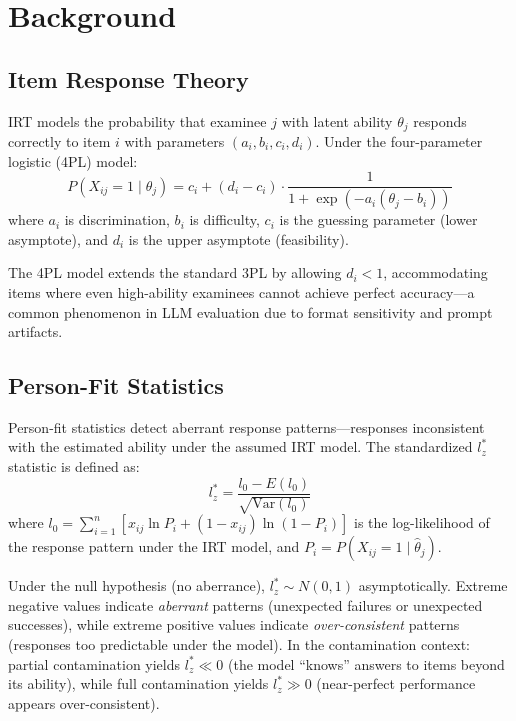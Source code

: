 \documentclass[11pt,a4paper]{article}
\begin{document}
\section{Background}

\subsection{Item Response Theory}

IRT models the probability that examinee $j$ with latent ability $\theta_j$ responds correctly to item $i$ with parameters $(a_i, b_i, c_i, d_i)$. Under the four-parameter logistic (4PL) model:
\begin{equation}
P(X_{ij}=1 \mid \theta_j) = c_i + (d_i - c_i) \cdot \frac{1}{1 + \exp(-a_i(\theta_j - b_i))}
\label{eq:4pl}
\end{equation}
where $a_i$ is discrimination, $b_i$ is difficulty, $c_i$ is the guessing parameter (lower asymptote), and $d_i$ is the upper asymptote (feasibility).

The 4PL model extends the standard 3PL by allowing $d_i < 1$, accommodating items where even high-ability examinees cannot achieve perfect accuracy---a common phenomenon in LLM evaluation due to format sensitivity and prompt artifacts.

\subsection{Person-Fit Statistics}

Person-fit statistics detect aberrant response patterns---responses inconsistent with the estimated ability under the assumed IRT model.
The standardized $l_{z}^{*}$ statistic \citep{drasgow1985appropriateness,snijders2001testing} is defined as:
\begin{equation}
l_{z}^{*} = \frac{l_0 - E(l_0)}{\sqrt{\text{Var}(l_0)}}
\label{eq:lzstar}
\end{equation}
where $l_0 = \sum_{i=1}^{n} [x_{ij} \ln P_i + (1-x_{ij}) \ln(1-P_i)]$ is the log-likelihood of the response pattern under the IRT model, and $P_i = P(X_{ij}=1 \mid \hat{\theta}_j)$.

Under the null hypothesis (no aberrance), $l_{z}^{*} \sim N(0,1)$ asymptotically.
Extreme negative values indicate \emph{aberrant} patterns (unexpected failures or unexpected successes), while extreme positive values indicate \emph{over-consistent} patterns (responses too predictable under the model).
In the contamination context: partial contamination yields $l_{z}^{*} \ll 0$ (the model ``knows'' answers to items beyond its ability), while full contamination yields $l_{z}^{*} \gg 0$ (near-perfect performance appears over-consistent).
\end{document}
